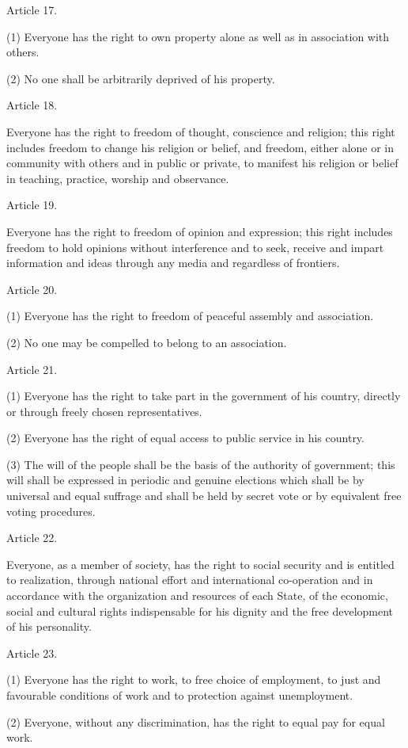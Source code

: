 \documentclass[11pt,a4paper]{article}
\begin{document}
Article 17.

(1) Everyone has the right to own property alone as well as in association with others.

(2) No one shall be arbitrarily deprived of his property.

Article 18.

Everyone has the right to freedom of thought, conscience and religion; this right includes freedom to change his religion or belief, and freedom, either alone or in community with others and in public or private, to manifest his religion or belief in teaching, practice, worship and observance.

Article 19.

Everyone has the right to freedom of opinion and expression; this right includes freedom to hold opinions without interference and to seek, receive and impart information and ideas through any media and regardless of frontiers.

Article 20.

(1) Everyone has the right to freedom of peaceful assembly and association.

(2) No one may be compelled to belong to an association.

Article 21.

(1) Everyone has the right to take part in the government of his country, directly or through freely chosen representatives.

(2) Everyone has the right of equal access to public service in his country.

(3) The will of the people shall be the basis of the authority of government; this will shall be expressed in periodic and genuine elections which shall be by universal and equal suffrage and shall be held by secret vote or by equivalent free voting procedures.

Article 22.

Everyone, as a member of society, has the right to social security and is entitled to realization, through national effort and international co-operation and in accordance with the organization and resources of each State, of the economic, social and cultural rights indispensable for his dignity and the free development of his personality.

Article 23.

(1) Everyone has the right to work, to free choice of employment, to just and favourable conditions of work and to protection against unemployment.

(2) Everyone, without any discrimination, has the right to equal pay for equal work.
\end{document}
